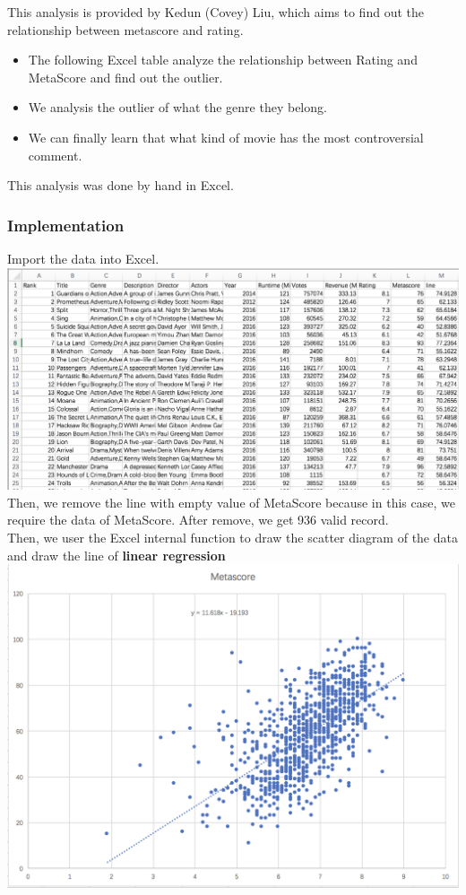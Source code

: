 \documentclass[11pt]{article}
\makeatletter
\def\maxwidth{\ifdim\Gin@nat@width>\linewidth\linewidth
    \else\Gin@nat@width\fi}
\let\Oldincludegraphics\includegraphics
\renewcommand{\includegraphics}[1]{\Oldincludegraphics[width=.8\maxwidth]{#1}}
\makeatother
\begin{document}
This analysis is provided by Kedun (Covey) Liu, which aims to find out
the relationship between metascore and rating. 
\begin{itemize}
    \item The following Excel table analyze the relationship between Rating and MetaScore and find out the outlier. 
    \item We analysis the outlier of what the genre they belong.
    \item We can finally learn that what kind of movie has the most controversial comment.
\end{itemize}
This analysis was done by hand in Excel.

\subsubsection{Implementation}\label{implementation}
Import the data into Excel. 
\\
\includegraphics{excel-table.png}
\\
Then, we remove the line with empty value of MetaScore because in this
case, we require the data of MetaScore. After remove, we get 936 valid
record.
\\
Then, we user the Excel internal function to draw the scatter diagram of
the data and draw the line of \textbf{linear regression}
\\
\includegraphics{linear-regreesion.png}
\end{document}
